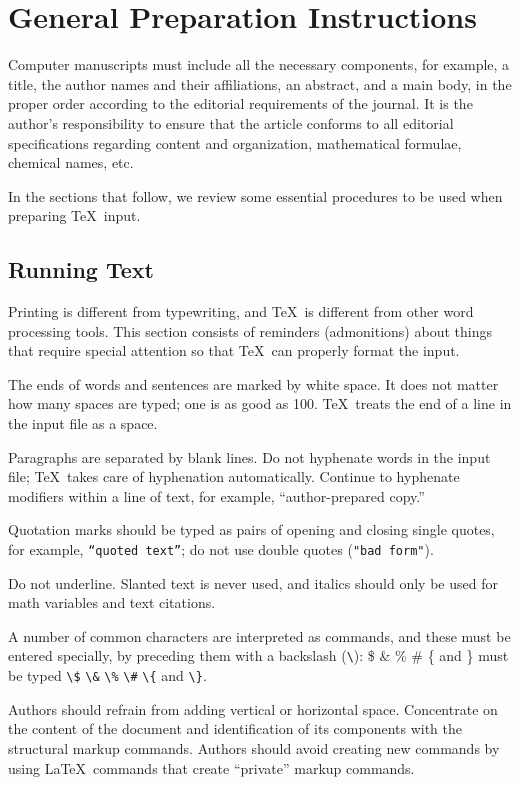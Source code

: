 \section{General Preparation Instructions}

Computer manuscripts must include all the necessary components,
for example, a title, the author names and their affiliations,
an abstract, and a main body, in the proper order according to 
the editorial requirements of the journal.  It is the author's 
responsibility to ensure that the article conforms to all editorial 
specifications regarding content and organization, mathematical 
formulae, chemical names, etc.

In the sections that follow, we review some essential 
procedures to be used when preparing \TeX\ input.

\subsection{Running Text}

Printing is different from typewriting, and \TeX\ is different
from other word processing tools.  This section consists of
reminders (admonitions) about things that require special
attention so that \TeX\ can properly format the input.

The ends of words and sentences are marked by white space.  
It does not matter how many spaces are typed; one is as
good as 100.  \TeX\ treats the end of a line in the input 
file as a space.

Paragraphs are separated by blank lines.  Do not hyphenate 
words in the input file; \TeX\ takes care of hyphenation 
automatically.  Continue to hyphenate modifiers within a 
line of text, for example, ``author-prepared copy.''

Quotation marks should be typed as pairs of opening and
closing single quotes, for example, {\tt ``quoted text''};
do not use double quotes ({\tt "bad form"}).

Do not underline.  Slanted text is never used, and italics 
should only be used for math variables and text citations.

A number of common characters are interpreted as commands,
and these must be entered specially, by preceding them with
a backslash (\verb"\"): \$ \& \% \# \{ and \} must be typed
\verb"\$" \verb"\&" \verb"\%" \verb"\#" \verb"\{" and \verb"\}".

Authors should refrain from adding vertical or horizontal space.
Concentrate on the content of the document and identification of 
its components with the structural markup commands.  Authors should  
avoid creating new commands by using \LaTeX\ commands that create 
``private'' markup commands.

